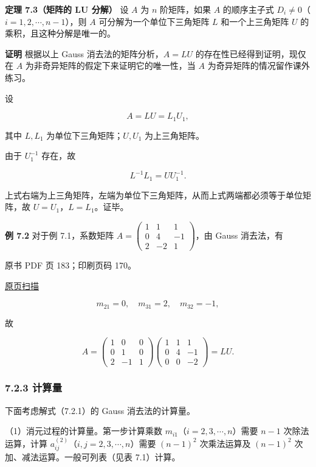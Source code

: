 \textbf{定理 7.3（矩阵的 LU 分解）} 设 \(A\) 为 \(n\) 阶矩阵，如果 \(A\) 的顺序主子式 \(D_i\ne0\)（\(i=1,2,\cdots,n-1\)），则 \(A\) 可分解为一个单位下三角矩阵 \(L\) 和一个上三角矩阵 \(U\) 的乘积，且这种分解是唯一的。

\textbf{证明} 根据以上 Gauss 消去法的矩阵分析，\(A=LU\) 的存在性已经得到证明，现仅在 \(A\) 为非奇异矩阵的假定下来证明它的唯一性，当 \(A\) 为奇异矩阵的情况留作课外练习。

设

\[A=LU=L_1U_1,\]

其中 \(L,L_1\) 为单位下三角矩阵；\(U,U_1\) 为上三角矩阵。

由于 \(U_1^{-1}\) 存在，故

\[L^{-1}L_1=UU_1^{-1}.\]

上式右端为上三角矩阵，左端为单位下三角矩阵，从而上式两端都必须等于单位矩阵，故 \(U=U_1\)，\(L=L_1\)。证毕。

\textbf{例 7.2} 对于例 7.1，系数矩阵 \(A=\begin{pmatrix}1&1&1\\0&4&-1\\2&-2&1\end{pmatrix}\)，由 Gauss 消去法，有

\clearpage

原书 PDF 页 183；印刷页码 170。

\href{source-images/pdf-183.jpeg}{原页扫描}

\[m_{21}=0,\quad m_{31}=2,\quad m_{32}=-1,\]

故

\[
A=\begin{pmatrix}1&0&0\\0&1&0\\2&-1&1\end{pmatrix}
\begin{pmatrix}1&1&1\\0&4&-1\\0&0&-2\end{pmatrix}=LU.
\]

\subsubsection{7.2.3 计算量}\label{ch07a-ux8ba1ux7b97ux91cf}

下面考虑解式（7.2.1）的 Gauss 消去法的计算量。

（1）消元过程的计算量。第一步计算乘数 \(m_{i1}\)（\(i=2,3,\cdots,n\)）需要 \(n-1\) 次除法运算，计算 \(a_{ij}^{(2)}\)（\(i,j=2,3,\cdots,n\)）需要 \((n-1)^2\) 次乘法运算及 \((n-1)^2\) 次加、减法运算。一般可列表（见表 7.1）计算。

